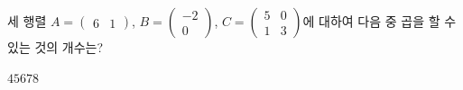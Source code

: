 세 행렬 $A=\begin{pmatrix} 6 & 1 \end{pmatrix}$, $B=\begin{pmatrix} -2 \\ 0 \end{pmatrix}$, $C=\begin{pmatrix} 5 & 0 \\ 1 & 3 \end{pmatrix}$에 대하여 다음 중 곱을 할 수 있는 것의 개수는?
\begin{choices32}{$4$}{$5$}{$6$}{$7$}{$8$}\end{choices32}
